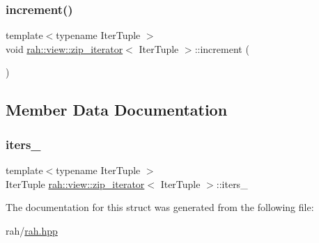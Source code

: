 \mbox{\label{structrah_1_1view_1_1zip__iterator_a156b181d725c31af3c34180806d6428e}} 
\subsubsection{\texorpdfstring{increment()}{increment()}}
{\footnotesize\ttfamily template$<$typename Iter\+Tuple $>$ \\
void \mbox{\hyperlink{structrah_1_1view_1_1zip__iterator}{rah\+::view\+::zip\+\_\+iterator}}$<$ Iter\+Tuple $>$\+::increment (\begin{DoxyParamCaption}{ }\end{DoxyParamCaption})\hspace{0.3cm}{\ttfamily [inline]}}



\subsection{Member Data Documentation}
\mbox{\label{structrah_1_1view_1_1zip__iterator_a58f5f6dd935fe51dd3c3a28e3b06ecc9}} 
\subsubsection{\texorpdfstring{iters\_}{iters\_}}
{\footnotesize\ttfamily template$<$typename Iter\+Tuple $>$ \\
Iter\+Tuple \mbox{\hyperlink{structrah_1_1view_1_1zip__iterator}{rah\+::view\+::zip\+\_\+iterator}}$<$ Iter\+Tuple $>$\+::iters\+\_\+}



The documentation for this struct was generated from the following file\+:\begin{DoxyCompactItemize}
\item 
rah/\mbox{\hyperlink{rah_8hpp}{rah.\+hpp}}\end{DoxyCompactItemize}
